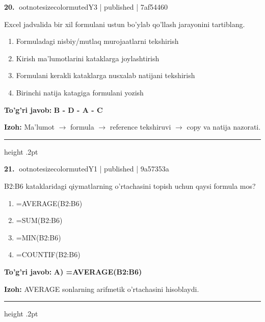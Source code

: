 \documentclass[10pt,a4paper]{article}
\begin{document}
\textbf{\color{ink}20.} {ootnotesizecolor{muted}Y3 | published | 7af54460}
\par
Excel jadvalida bir xil formulani ustun bo'ylab qo'llash jarayonini tartiblang.
\begin{enumerate}[label=\Alph*),leftmargin=9mm]
\item Formuladagi nisbiy/mutlaq murojaatlarni tekshirish
\item Kirish ma'lumotlarini kataklarga joylashtirish
\item Formulani kerakli kataklarga nusxalab natijani tekshirish
\item Birinchi natija katagiga formulani yozish
\end{enumerate}
\begin{tcolorbox}[enhanced,breakable,colback=teal!4,colframe=teal!55!black,boxrule=0.45pt,arc=1.2mm,left=2.8mm,right=2.8mm,top=2mm,bottom=2mm]
\textbf{\color{teal}To'g'ri javob:} \textbf{B - D - A - C}
\par\smallskip
\textbf{Izoh:} Ma'lumot \ensuremath{\rightarrow} formula \ensuremath{\rightarrow} reference tekshiruvi \ensuremath{\rightarrow} copy va natija nazorati.
\end{tcolorbox}
\vspace{2mm}\hrule height .2pt\vspace{2mm}

\textbf{\color{ink}21.} {ootnotesizecolor{muted}Y1 | published | 9a57353a}
\par
B2:B6 kataklaridagi qiymatlarning o'rtachasini topish uchun qaysi formula mos?
\begin{enumerate}[label=\Alph*),leftmargin=9mm]
\item =AVERAGE(B2:B6)
\item =SUM(B2:B6)
\item =MIN(B2:B6)
\item =COUNTIF(B2:B6)
\end{enumerate}
\begin{tcolorbox}[enhanced,breakable,colback=teal!4,colframe=teal!55!black,boxrule=0.45pt,arc=1.2mm,left=2.8mm,right=2.8mm,top=2mm,bottom=2mm]
\textbf{\color{teal}To'g'ri javob:} \textbf{A) =AVERAGE(B2:B6)}
\par\smallskip
\textbf{Izoh:} AVERAGE sonlarning arifmetik o'rtachasini hisoblaydi.
\end{tcolorbox}
\vspace{2mm}\hrule height .2pt\vspace{2mm}
\end{document}
